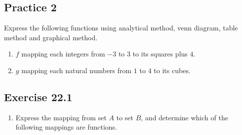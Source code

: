 \documentclass{report}
\begin{document}
\begin{multicols}{2}
  \subsection{Practice 2}

  Express the following functions using analytical method, venn diagram, table
  method and graphical method.
  \begin{enumerate}[label=(\alph*)]
    \item $f$ mapping each integers from $-3$ to $3$ to its squares plus $4$.
    \item $g$ mapping each natural numbers from $1$ to $4$ to its cubes.
  \end{enumerate}

  \subsection{Exercise 22.1}

  \begin{enumerate}
    \item Express the mapping from set $A$ to set $B$, and determine which of the
          following mappings are functions.



\end{enumerate}
\end{multicols}
\end{document}
